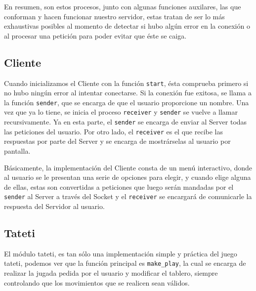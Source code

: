 \documentclass[11pt]{article}
\begin{document}
En resumen, son estos procesos, junto con algunas funciones auxilares, las que conforman
y hacen funcionar nuestro servidor, estas tratan de ser lo más exhaustivas posibles al
momento de detectar si hubo algún error en la conexión o al procesar una petición para poder
evitar que éste se caiga.

\subsection*{Cliente}

Cuando inicializamos el Cliente con la función \texttt{start}, ésta comprueba primero
si no hubo ningún error al intentar conectarse. Si la conexión fue exitosa, se llama a la
función \texttt{sender}, que se encarga de que el usuario proporcione un nombre. Una vez
que ya lo tiene, se inicia el proceso \texttt{receiver} y \texttt{sender} se vuelve a llamar
recursivamente. Ya en esta parte, el \texttt{sender} se encarga de enviar al Server todas 
las peticiones del usuario. Por otro lado, el \texttt{receiver} es el que recibe las respuestas
por parte del Server y se encarga de mostrárselas al usuario por pantalla.

Básicamente, la implementación del Cliente consta de un menú interactivo, donde al usuario se le presentan
una serie de opciones para elegir, y cuando elige alguna de ellas, estas son convertidas a 
peticiones que luego serán mandadas por el \texttt{sender} al Server a través del Socket y el
\texttt{receiver} se encargará de comunicarle la respuesta del Servidor al usuario. 

\newpage

\subsection*{Tateti}

El módulo tateti, es tan sólo una implementación simple y práctica del juego tateti, podemos ver
que la función principal es \texttt{make\_play}, la cual se encarga de realizar la jugada
pedida por el usuario y modificar el tablero, siempre controlando que los movimientos 
que se realicen sean válidos.
\end{document}

